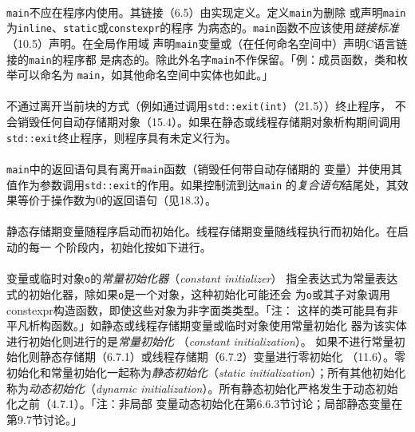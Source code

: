 \paragraph{}
\texttt{main}不应在程序内使用。其链接（6.5）由实现定义。定义\texttt{main}为删除
或声明\texttt{main}为\texttt{inline}、\texttt{static}或\texttt{constexpr}的程序
为病态的。\texttt{main}函数不应该使用\textit{链接标准}（10.5）声明。在全局作用域
声明\texttt{main}变量或（在任何命名空间中）声明C语言链接的\texttt{main}的程序都
是病态的。除此外名字\texttt{main}不作保留。「例：成员函数，类和枚举可以命名为
\texttt{main}，如其他命名空间中实体也如此。」

\paragraph{}
不通过离开当前块的方式（例如通过调用\texttt{std::exit(int)}（21.5））终止程序，
不会销毁任何自动存储期对象（15.4）。如果在静态或线程存储期对象析构期间调用
\texttt{std::exit}终止程序，则程序具有未定义行为。

\paragraph{}
\texttt{main}中的返回语句具有离开\texttt{main}函数（销毁任何带自动存储期的
变量）并使用其值作为参数调用\texttt{std::exit}的作用。如果控制流到达\texttt{main}
的\textit{复合语句}结尾处，其效果等价于操作数为$0$的返回语句（见18.3）。

\paragraph{}
静态存储期变量随程序启动而初始化。线程存储期变量随线程执行而初始化。在启动的每一
个阶段内，初始化按如下进行。

\paragraph{}
变量或临时对象\texttt{o}的\textit{常量初始化器}（\textit{constant initializer}）
指全表达式为常量表达式的初始化器，除如果\texttt{o}是一个对象，这种初始化可能还会
为\texttt{o}或其子对象调用constexpr构造函数，即使这些对象为非字面类类型。「注：
这样的类可能具有非平凡析构函数。」如静态或线程存储期变量或临时对象使用常量初始化
器为该实体进行初始化则进行的是\textit{常量初始化}
（\textit{constant initialization}）。
如果不进行常量初始化则静态存储期（6.7.1）或线程存储期（6.7.2）变量进行零初始化
（11.6）。零初始化和常量初始化一起称为\textit{静态初始化}（\textit{static
initialization}）；所有其他初始化称为\textit{动态初始化}（\textit{dynamic
initialization}）。所有静态初始化严格发生于动态初始化之前（4.7.1）。「注：非局部
变量动态初始化在第6.6.3节讨论；局部静态变量在第9.7节讨论。」


